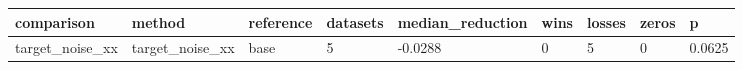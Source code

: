 \begin{tabular}{lllllllll}
\toprule
comparison & method & reference & datasets & median\_reduction & wins & losses & zeros & p \\
\midrule
target\_noise\_xx & target\_noise\_xx & base & 5 & -0.0288 & 0 & 5 & 0 & 0.0625 \\
\bottomrule
\end{tabular}
